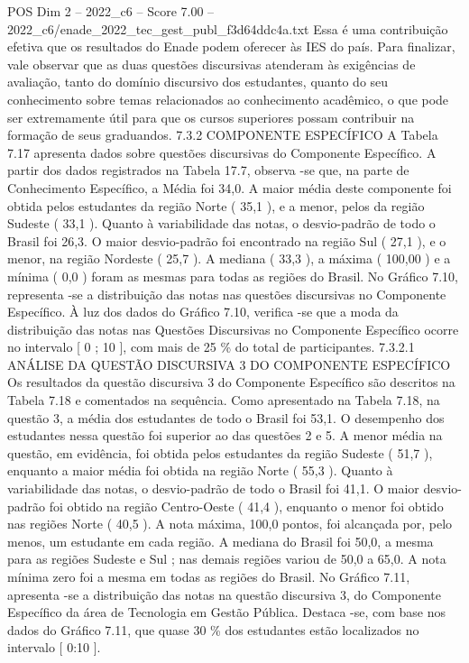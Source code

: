 \begin{textsample}{POS Dim 2 – 2022\_c6 – Score 7.00 – 2022\_c6/enade\_2022\_tec\_gest\_publ\_f3d64ddc4a.txt}
Essa é uma contribuição efetiva que os resultados do Enade podem oferecer às IES do país.
Para finalizar, vale observar que as duas questões discursivas atenderam às exigências de avaliação, tanto do domínio discursivo dos estudantes, quanto do seu conhecimento sobre temas relacionados ao conhecimento acadêmico, o que pode ser extremamente útil para que os cursos superiores possam contribuir na formação de seus graduandos. 7.3.2 COMPONENTE ESPECÍFICO A Tabela 7.17 apresenta dados sobre questões discursivas do Componente Específico.
A partir dos dados registrados na Tabela 17.7, observa -se que, na parte de Conhecimento Específico, a Média foi 34,0.
A maior média deste componente foi obtida pelos estudantes da região Norte ( 35,1 ), e a menor, pelos da região Sudeste ( 33,1 ).
Quanto à variabilidade das notas, o desvio-padrão de todo o Brasil foi 26,3.
O maior desvio-padrão foi encontrado na região Sul ( 27,1 ), e o menor, na região Nordeste ( 25,7 ).
A mediana ( 33,3 ), a máxima ( 100,00 ) e a mínima ( 0,0 ) foram as mesmas para todas as regiões do Brasil.
No Gráfico 7.10, representa -se a distribuição das notas nas questões discursivas no Componente Específico.
À luz dos dados do Gráfico 7.10, verifica -se que a moda da distribuição das notas nas Questões Discursivas no Componente Específico ocorre no intervalo [ 0 ; 10 ], com mais de 25 \% do total de participantes. 7.3.2.1 ANÁLISE DA QUESTÃO DISCURSIVA 3 DO COMPONENTE ESPECÍFICO Os resultados da questão discursiva 3 do Componente Específico são descritos na Tabela 7.18 e comentados na sequência.
Como apresentado na Tabela 7.18, na questão 3, a média dos estudantes de todo o Brasil foi 53,1.
O desempenho dos estudantes nessa questão foi superior ao das questões 2 e 5.
A menor média na questão, em evidência, foi obtida pelos estudantes da região Sudeste ( 51,7 ), enquanto a maior média foi obtida na região Norte ( 55,3 ).
Quanto à variabilidade das notas, o desvio-padrão de todo o Brasil foi 41,1.
O maior desvio-padrão foi obtido na região Centro-Oeste ( 41,4 ), enquanto o menor foi obtido nas regiões Norte ( 40,5 ).
A nota máxima, 100,0 pontos, foi alcançada por, pelo menos, um estudante em cada região.
A mediana do Brasil foi 50,0, a mesma para as regiões Sudeste e Sul ; nas demais regiões variou de 50,0 a 65,0.
A nota mínima zero foi a mesma em todas as regiões do Brasil.
No Gráfico 7.11, apresenta -se a distribuição das notas na questão discursiva 3, do Componente Específico da área de Tecnologia em Gestão Pública.
Destaca -se, com base nos dados do Gráfico 7.11, que quase 30 \% dos estudantes estão localizados no intervalo [ 0:10 ].

\end{textsample}
